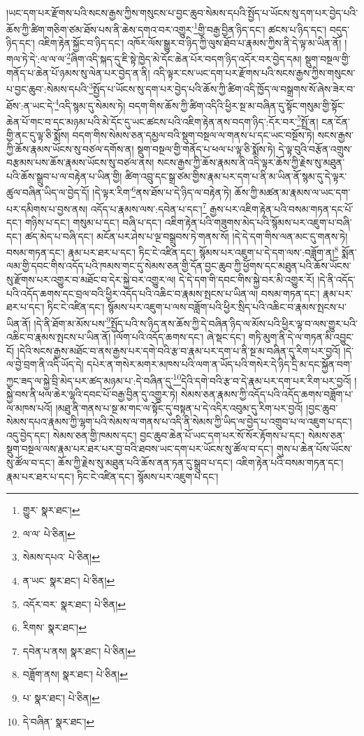 །ཡང་དག་པར་རྫོགས་པའི་སངས་རྒྱས་ཀྱིས་གསུངས་པ་བྱང་ཆུབ་སེམས་དཔའི་སྤྱོད་པ་ཡོངས་སུ་དག་པར་བྱེད་པའི་ཆོས་ཀྱི་ཚིག་གཅིག་ཙམ་ཐོས་པས་ནི་ཆེས་དགའ་བར་འགྱུར་\footnote{གྱུར་  སྣར་ཐང་། }གྱི་བརྒྱ་བྱིན་ཉིད་དང་། ཚངས་པ་ཉིད་དང་། བདུད་ཉིད་དང་། འཇིག་རྟེན་སྐྱོང་བ་ཉིད་དང་། འཁོར་ལོས་སྒྱུར་བ་ཉིད་ཀྱི་ལུས་ཐོབ་པ་རྣམས་ཀྱིས་ནི་དེ་ལྟ་མ་ཡིན་ནོ། །གལ་ཏེ་དེ་:ལ་ལ་ལ་\footnote{ལ་ལ་  པེ་ཅིན། }ཞིག་འདི་སྐད་དུ་ཇི་སྟེ་ཁྱེད་མེ་དོང་ཆེན་པོར་བདག་ཉིད་འདོར་བར་བྱེད་དམ། སྡུག་བསྔལ་གྱི་གནོད་པ་ཆེན་པོ་ཉམས་སུ་ལེན་པར་བྱེད་ན་ནི། འདི་ལྟར་ངས་ཡང་དག་པར་རྫོགས་པའི་སངས་རྒྱས་ཀྱིས་གསུངས་པ་བྱང་ཆུབ་:སེམས་དཔའི་\footnote{སེམས་དཔའ་  པེ་ཅིན། }སྤྱོད་པ་ཡོངས་སུ་དག་པར་བྱེད་པའི་ཆོས་ཀྱི་ཚིག་འདི་ཁྱོད་ལ་བསྒྲགས་སོ་ཞེས་ཟེར་བ་ཐོས་:ན་ཡང་དེ་\footnote{ན་ཡང་  སྣར་ཐང་།  པེ་ཅིན། }འདི་སྙམ་དུ་སེམས་ཏེ། བདག་གིས་ཆོས་ཀྱི་ཚིག་འདིའི་ཕྱིར་སྔ་མ་བཞིན་དུ་སྟོང་གསུམ་གྱི་སྟོང་ཆེན་པོ་གང་བ་དང་མཉམ་པའི་མེ་དོང་དུ་ཡང་ཚངས་པའི་འཇིག་རྟེན་ནས་བདག་ཉིད་:དོར་བར་\footnote{འདོར་བར་  སྣར་ཐང་།  པེ་ཅིན། }སྤྲོ་ན། ངན་ངོན་གྱི་ནང་དུ་ལྟ་ཅི་སྨོས། བདག་གིས་སེམས་ཅན་དམྱལ་བའི་སྡུག་བསྔལ་ལ་གནས་པ་དང་ཡང་བསྔོས་ཏེ། སངས་རྒྱས་ཀྱི་ཆོས་རྣམས་ཡོངས་སུ་བཙལ་དགོས་ན། སྡུག་བསྔལ་གྱི་གནོད་པ་ཕལ་པ་ལྟ་ཅི་སྨོས་ཏེ། དེ་ལྟ་བུའི་བརྩོན་འགྲུས་བརྩམས་པས་ཆོས་རྣམས་ཡོངས་སུ་བཙལ་ནས། སངས་རྒྱས་ཀྱི་ཆོས་རྣམས་ནི་འདི་ལྟར་ཆོས་ཀྱི་རྗེས་སུ་མཐུན་པའི་ཆོས་སྒྲུབ་པ་ལ་བརྟེན་པ་ཡིན་གྱི། ཚིག་འབྲུ་དང་སྒྲ་ཙམ་གྱིས་རྣམ་པར་དག་པ་ནི་མ་ཡིན་ནོ་སྙམ་དུ་དེ་ལྟར་ཚུལ་བཞིན་ཡིད་ལ་བྱེད་དོ། །དེ་ལྟར་རིག་\footnote{རིགས་  སྣར་ཐང་། }ནས་ཐོས་པ་དེ་ཉིད་ལ་བརྟེན་ཏེ། ཆོས་ཀྱི་མཚན་མ་རྣམས་ལ་ཡང་དག་པར་དམིགས་པ་བྱས་ནས། འདོད་པ་རྣམས་ལས་:དབེན་པ་དང་།\footnote{དབེན་པ་ནས།  སྣར་ཐང་།  པེ་ཅིན། } རྒྱས་པར་འཇིག་རྟེན་པའི་བསམ་གཏན་དང་པོ་དང་། གཉིས་པ་དང་། གསུམ་པ་དང་། བཞི་པ་དང་། འཇིག་རྟེན་པའི་གཟུགས་མེད་པའི་སྙོམས་པར་འཇུག་པ་བཞི་དང་། ཚད་མེད་པ་བཞི་དང་། མངོན་པར་ཤེས་པ་ལྔ་བསྒྲུབས་ཏེ་གནས་སོ། །དེ་དེ་དག་གིས་ལན་མང་དུ་གནས་ཏེ། བསམ་གཏན་དང་། རྣམ་པར་ཐར་པ་དང་། ཏིང་ངེ་འཛིན་དང་། སྙོམས་པར་འཇུག་པ་དེ་དག་ལས་:བཟློག་ན།\footnote{བཟློག་ནས།  སྣར་ཐང་།  པེ་ཅིན། } སྨོན་ལམ་གྱི་དབང་གིས་འདོད་པའི་ཁམས་གང་དུ་སེམས་ཅན་གྱི་དོན་བྱང་ཆུབ་ཀྱི་ཕྱོགས་དང་མཐུན་པའི་ཆོས་ཡོངས་སུ་རྫོགས་པར་འགྱུར་བ་མཐོང་བ་དེར་སྐྱེ་བར་འགྱུར་ལ། དེ་དེ་དག་གི་དབང་གིས་སྐྱེ་བར་མི་འགྱུར་རོ། །དེ་ནི་འདོད་པའི་འདོད་ཆགས་དང་བྲལ་བའི་ཕྱིར་འདོད་པའི་འཆིང་བ་རྣམས་སྤངས་པ་ཡིན་ལ། བསམ་གཏན་དང་། རྣམ་པར་ཐར་པ་དང་། ཏིང་ངེ་འཛིན་དང་། སྙོམས་པར་འཇུག་པ་ལས་བཟློག་པའི་ཕྱིར་སྲིད་པའི་འཆིང་བ་རྣམས་སྤངས་པ་ཡིན་ནོ། །དེ་ནི་ཐོག་མ་མོས་པས་\footnote{པ་  སྣར་ཐང་།  པེ་ཅིན། }སྤྱོད་པའི་ས་ཉིད་ནས་ཆོས་ཀྱི་དེ་བཞིན་ཉིད་ལ་མོས་པའི་ཕྱིར་ལྟ་བ་ལས་གྱུར་པའི་འཆིང་བ་རྣམས་སྤངས་པ་ཡིན་ནོ། །ལོག་པའི་འདོད་ཆགས་དང་། ཞེ་སྡང་དང་། གཏི་མུག་ནི་དེ་ལ་གཏན་མི་འབྱུང་ངོ། །དེའི་སངས་རྒྱས་མཐོང་བ་ནས་རྒྱས་པར་དགེ་བའི་རྩ་བ་རྣམ་པར་དག་པ་ནི་སྔ་མ་བཞིན་དུ་རིག་པར་བྱའོ། །དེ་ལ་བྱེ་བྲག་ནི་འདི་ཡོད་དེ། དཔེར་ན་གསེར་མགར་མཁས་པའི་ལག་ན་ཡོད་པའི་གསེར་དེ་ཉིད་དྲི་མ་དང་སྐྱོན་བག་ཀྱང་ཟད་ལ་སྐྱེ་བྲི་མེད་པར་ཚད་མཉམ་པ་:དེ་བཞིན་དུ་\footnote{དེ་བཞིན་  སྣར་ཐང་། }དེའི་དགེ་བའི་རྩ་བ་དེ་རྣམ་པར་དག་པར་རིག་པར་བྱའོ། །སྐྱེ་བས་ནི་ཕལ་ཆེར་ལྷའི་དབང་པོ་བརྒྱ་བྱིན་དུ་འགྱུར་ཏེ། སེམས་ཅན་རྣམས་ཀྱི་འདོད་པའི་འདོད་ཆགས་བཟློག་པ་ལ་མཁས་པའོ། །མཐུ་ནི་གནས་པ་སྔ་མ་གང་ལ་སྟོང་དུ་བསྟན་པ་དེ་འདིར་འབུམ་དུ་རིག་པར་བྱའོ། །བྱང་ཆུབ་སེམས་དཔའ་རྣམས་ཀྱི་ལྷག་པའི་སེམས་ལ་གནས་པ་འདི་ནི་སེམས་ཀྱི་ཡིད་ལ་བྱེད་པ་འགྲུབ་པ་ལ་འཇུག་པ་དང་། འདུ་བྱེད་དང་། སེམས་ཅན་གྱི་ཁམས་དང་། བྱང་ཆུབ་ཆེན་པོ་ཡང་དག་པར་སོ་སོར་རྟོགས་པ་དང་། སེམས་ཅན་སྡུག་བསྔལ་ལས་རྣམ་པར་ཐར་པར་བྱ་བའི་ཐབས་ཡང་དག་པར་ཡོངས་སུ་ཚོལ་བ་དང་། གུས་པ་ཆེན་པོས་ཡོངས་སུ་ཚོལ་བ་དང་། ཆོས་ཀྱི་རྗེས་སུ་མཐུན་པའི་ཆོས་ནན་ཏན་དུ་སྒྲུབ་པ་དང་། འཇིག་རྟེན་པའི་བསམ་གཏན་དང་། རྣམ་པར་ཐར་པ་དང་། ཏིང་ངེ་འཛིན་དང་། སྙོམས་པར་འཇུག་པ་དང་། 
